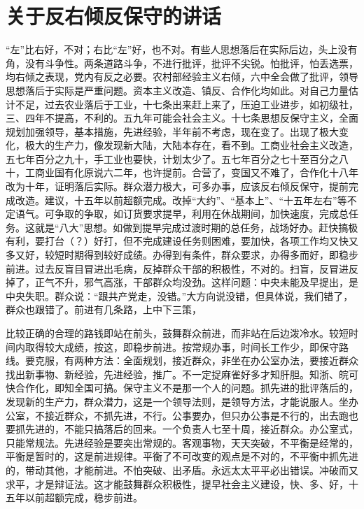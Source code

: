 \section[关于反右倾反保守的讲话（一九五五年十二月六日）]{关于反右倾反保守的讲话}


“左”比右好，不对；右比“左”好，也不对。有些人思想落后在实际后边，头上没有角，没有斗争性。两条道路斗争，不进行批评，批评不尖锐。怕批评，怕丢选票，均右倾之表现，党内有反之必要。农村部经验主义右倾，六中全会做了批评，领导思想落后于实际是严重问题。资本主义改造、镇反、合作化均如此。对自己力量估计不足，过去农业落后于工业，十七条出来赶上来了，压迫工业进步，如初级社，三、四年不提高，不利的。五九年可能会社会主义。十七条思想反保守主义，全面规划加强领导，基本措施，先进经验，半年前不考虑，现在变了。出现了极大变化，极大的生产力，像发现新大陆，大陆本存在，看不到。工商业社会主义改造，五七年百分之九十，手工业也要快，计划太少了。五七年百分之七十至百分之八十，工商业国有化原说六二年，也许提前。合营了，变国又不难了，合作化十八年改为十年，证明落后实际。群众潜力极大，可多办事，应该反右倾反保守，提前完成改造。建议，十五年以前超额完成。改掉“大约”、“基本上”、“十五年左右”等不定语气。可争取的争取，如订货要求提早，利用在休战期间，加快速度，完成总任务。这就是“八大”思想。如做到提早完成过渡时期的总任务，战场好办。赶快搞极有利，要打台（？）好打，但不完成建设任务则困难，要加快，各项工作均又快又多又好，较短时期得到较好成绩。办得到有条件，群众要求，办得多而好，即稳步前进。过去反盲目冒进出毛病，反掉群众干部的积极性，不对的。扫盲，反冒进反掉了，正气不升，邪气高涨，干部群众均没劲。这样问题：中央未能及早提出，是中央失职。群众说：“跟共产党走，没错。”大方向说没错，但具体说，我们错了，群众也跟错了。前进有几条路，上中下三策，

比较正确的合理的路钱即站在前头，鼓舞群众前进，而非站在后边泼冷水。较短时间内取得较大成绩，按这，即稳步前进。按常规办事，时间长工作少，即保守路线。要克服，有两种方法：全面规划，接近群众，非坐在办公室办法，要接近群众找出新事物、新经验，先进经验，推广。不一定捉麻雀好多才知肝胆。知浙、皖可快合作化，即知全国可搞。保守主义不是那一个人的问题。抓先进的批评落后的，发现新的生产力，群众潜力，这是一个领导法则，是领导方法，才能说服人。坐办公室，不接近群众，不抓先进，不行。公事要办，但只办公事是不行的，出去跑也要抓先进的，不能只搞落后的回来。一个负责人七至十周，接近群众。办公室式，只能常规法。先进经验是要突出常规的。客观事物，天天突破，不平衡是经常的，平衡是暂时的，这是前进规律。平衡了不可改变的观点是不对的，不平衡中抓先进的，带动其他，才能前进。不怕突破、出矛盾。永远太太平平必出错误。冲破而又求平，才是辩证法。这才能鼓舞群众积极性，提早社会主义建设，快、多、好，十五年以前超额完成，稳步前进。


